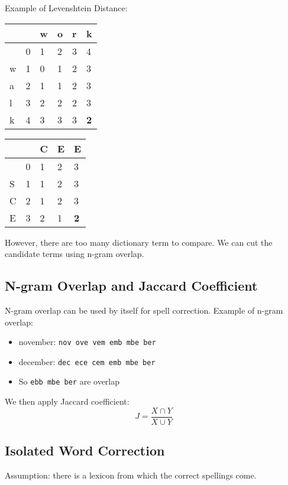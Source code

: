 \begin{multicols*}{2}
\noindent Example of Levenshtein Distance:
\begin{center}
\begin{tabular}{ | l | l  l  l  l  l |} 
    \hline
      &   & w & o & r & k \\
    \hline
      & 0 & 1 & 2 & 3 & 4 \\
    w & 1 & 0 & 1 & 2 & 3 \\
    a & 2 & 1 & 1 & 2 & 3 \\
    l & 3 & 2 & 2 & 2 & 3 \\
    k & 4 & 3 & 3 & 3 & \textbf{2} \\
    \hline
\end{tabular}
\end{center}

\begin{center}
\begin{tabular}{ | l | l  l  l  l  |} 
    \hline
      &   & C & E & E \\
    \hline
      & 0 & 1 & 2 & 3 \\
    S & 1 & 1 & 2 & 3 \\
    C & 2 & 1 & 2 & 3 \\
    E & 3 & 2 & 1 & \textbf{2} \\
    \hline
\end{tabular}
\end{center}

\noindent However, there are too many dictionary term to compare. We can cut the candidate terms using n-gram overlap.

\subsection{N-gram Overlap and Jaccard Coefficient}
\noindent N-gram overlap can be used by itself for spell correction. Example of n-gram overlap:
\begin{itemize}
    \item november: \verb|nov ove vem emb mbe ber|
    \item december: \verb|dec ece cem emb mbe ber|
    \item So \verb|ebb mbe ber| are overlap
\end{itemize}

\noindent We then apply Jaccard coefficient:
$$J=\frac{X\cap Y}{X\cup Y}$$

\subsection{Isolated Word Correction}
\noindent Assumption: there is a lexicon from which the correct spellings come.  \\


\end{multicols*}
